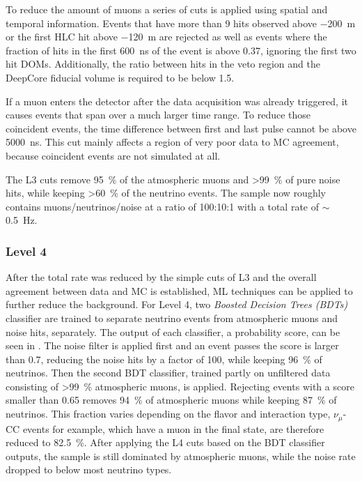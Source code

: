 To reduce the amount of muons a series of cuts is applied using spatial and temporal information. Events that have more than 9 hits observed above \SI{-200}{\meter} or the first HLC hit above \SI{-120}{\meter} are rejected as well as events where the fraction of hits in the first \SI{600}{\nano\second} of the event is above 0.37, ignoring the first two hit DOMs. Additionally, the ratio between hits in the veto region and the DeepCore fiducial volume is required to be below 1.5.

If a muon enters the detector after the data acquisition was already triggered, it causes events that span over a much larger time range. To reduce those coincident events, the time difference between first and last pulse cannot be above \SI{5000}{\nano\second}. This cut mainly affects a region of very poor data to MC agreement, because coincident events are not simulated at all.

The L3 cuts remove \SI{95}{\percent} of the atmospheric muons and >\SI{99}{\percent} of pure noise hits, while keeping >\SI{60}{\percent} of the neutrino events. The sample now roughly contains muons/neutrinos/noise at a ratio of 100:10:1 with a total rate of $\sim$\SI{0.5}{\hertz}.


\subsubsection{Level 4} 

After the total rate was reduced by the simple cuts of L3 and the overall agreement between data and MC is established, ML techniques can be applied to further reduce the background. For Level 4, two \textit{Boosted Decision Trees (BDTs)}  classifier are trained to separate neutrino events from atmospheric muons and noise hits, separately. The output of each classifier, a probability score, can be seen in . The noise filter is applied first and an event passes the score is larger than 0.7, reducing the noise hits by a factor of 100, while keeping \SI{96}{\percent} of neutrinos. Then the second BDT classifier, trained partly on unfiltered data consisting of >\SI{99}{\percent} atmospheric muons, is applied. Rejecting events with a score smaller than 0.65 removes \SI{94}{\percent} of atmospheric muons while keeping \SI{87}{\percent} of neutrinos. This fraction varies depending on the flavor and interaction type, $\nu_\mu$-CC events for example, which have a muon in the final state, are therefore reduced to \SI{82.5}{\percent}. After applying the L4 cuts based on the BDT classifier outputs, the sample is still dominated by atmospheric muons, while the noise rate dropped to below most neutrino types.

